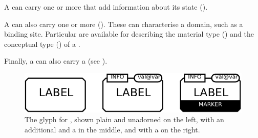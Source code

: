 \begin{glyphDescription}
\glyphAux
A  can carry one or more  that add information about its state ().

A  can also carry one or more  ().
These can characterise a domain, such as a binding site.
Particular  are available for describing the material type () and the conceptual type () of a .

Finally, a  can also carry a  (see ).

\end{glyphDescription}

\begin{figure}[H]
  \centering
  \includegraphics{images/build/complex_combined.pdf}
  \caption{The \PD glyph for , shown plain and unadorned on the left, with an additional  and a  in the middle, and with a  on the right.}
  \label{fig:complex}
\end{figure}

